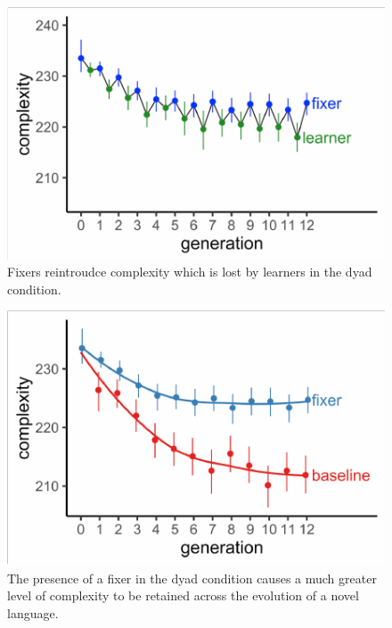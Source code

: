 \documentclass[10pt, letterpaper]{article}
\newenvironment{CodeChunk}{}{}
\begin{document}
\begin{CodeChunk}
\begin{figure}[tb]

{\centering \includegraphics{figs/dyad_complexity-1} 

}

\caption[Fixers reintroudce complexity which is lost by learners in the dyad condition]{Fixers reintroudce complexity which is lost by learners in the dyad condition.}\label{fig:dyad_complexity}
\end{figure}
\end{CodeChunk}

\begin{CodeChunk}
\begin{figure}[tb]

{\centering \includegraphics{figs/both_complexity-1} 

}

\caption[The presence of a fixer in the dyad condition causes a much greater level of complexity to be retained across the evolution of a novel language]{The presence of a fixer in the dyad condition causes a much greater level of complexity to be retained across the evolution of a novel language.}\label{fig:both_complexity}
\end{figure}
\end{CodeChunk}
\end{document}
